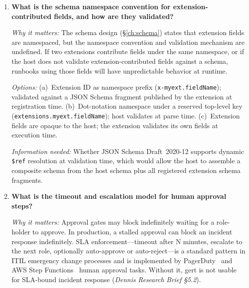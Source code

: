 \begin{enumerate}[label=\textbf{Q\arabic*.}]
    \textit{Options:} (a)~Compensations execute with the same governance context as the original
    step (same allowlist, same approver roles). (b)~Compensations are exempt from approval gates
    (compensations are emergency rollback actions; blocking them on approval would defeat their
    purpose). (c)~Compensation governance is separately configurable per compensation definition.

    \textit{Information needed:} Industry precedent from Temporal (compensation activities run in
    the same workflow context) and AWS Step Functions~\cite{aws-step-functions} (catch/retry blocks have no separate IAM
    policy). A decision here feeds into \S\ref{ch:schema} (compensation field design) and
    \S\ref{ch:security} (governance scope).

  \item \textbf{What is the schema namespace convention for extension-contributed fields, and how are
    they validated?}

    \textit{Why it matters:} The schema design (\S\ref{ch:schema}) states that extension fields
    are namespaced, but the namespace convention and validation mechanism are undefined. If two
    extensions contribute fields under the same namespace, or if the host does not validate
    extension-contributed fields against a schema, runbooks using those fields will have
    unpredictable behavior at runtime.

    \textit{Options:} (a)~Extension ID as namespace prefix (\texttt{x-myext.fieldName}); validated
    against a JSON Schema fragment published by the extension at registration time. (b)~Dot-notation
    namespace under a reserved top-level key (\texttt{extensions.myext.fieldName}); host validates
    at parse time. (c)~Extension fields are opaque to the host; the extension validates its own
    fields at execution time.

    \textit{Information needed:} Whether JSON Schema Draft~2020-12 supports dynamic
    \texttt{\$ref} resolution at validation time, which would allow the host to assemble a composite
    schema from the host schema plus all registered extension schema fragments.

  \item \textbf{What is the timeout and escalation model for human approval steps?}

    \textit{Why it matters:} Approval gates may block indefinitely waiting for a role-holder to
    approve. In production, a stalled approval can block an incident response indefinitely. SLA
    enforcement---timeout after N minutes, escalate to the next role, optionally auto-approve or
    auto-reject---is a standard pattern in ITIL emergency change processes and is implemented by
    PagerDuty~\cite{pagerduty-automation} and AWS Step Functions~\cite{aws-step-functions} human approval tasks. Without it, gert is not usable for SLA-bound
    incident response (\textit{Dennis Research Brief \S5.2}).


\end{enumerate}
